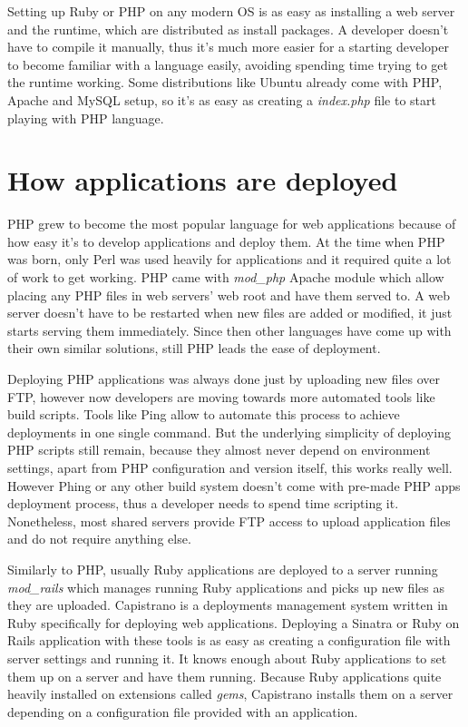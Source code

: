 Setting up Ruby or PHP on any modern OS is as easy as installing a web server and the runtime, which are distributed as install packages. A developer doesn't have to compile it manually, thus it's much more easier for a starting developer to become familiar with a language easily, avoiding spending time trying to get the runtime working. Some distributions like Ubuntu already come with PHP, Apache and MySQL setup, so it's as easy as creating a \textit{index.php} file to start playing with PHP language.

\section{How applications are deployed}

PHP grew to become the most popular language for web applications because of how easy it's to develop applications and deploy them. At the time when PHP was born, only Perl was used heavily for applications and it required quite a lot of work to get working. PHP came with \textit{mod\_php} Apache module which allow placing any PHP files in web servers' web root and have them served to. A web server doesn't have to be restarted when new files are added or modified, it just starts serving them immediately. Since then other languages have come up with their own similar solutions, still PHP leads the ease of deployment.

Deploying PHP applications was always done just by uploading new files over FTP, however now developers are moving towards more automated tools like build scripts. Tools like Ping\citep{phing} allow to automate this process to achieve deployments in one single command. But the underlying simplicity of deploying PHP scripts still remain, because they almost never depend on environment settings, apart from PHP configuration and version itself, this works really well. However Phing or any other build system doesn't come with pre-made PHP apps deployment process, thus a developer needs to spend time scripting it. Nonetheless, most shared servers provide FTP access to upload application files and do not require anything else.

Similarly to PHP, usually Ruby applications are deployed to a server running \textit{mod\_rails} which manages running Ruby applications and picks up new files as they are uploaded. Capistrano is a deployments management system written in Ruby specifically for deploying web applications. Deploying a Sinatra or Ruby on Rails application with these tools is as easy as creating a configuration file with server settings and running it. It knows enough about Ruby applications to set them up on a server and have them running. Because Ruby applications quite heavily installed on extensions called \textit{gems}, Capistrano installs them on a server depending on a configuration file provided with an application.

